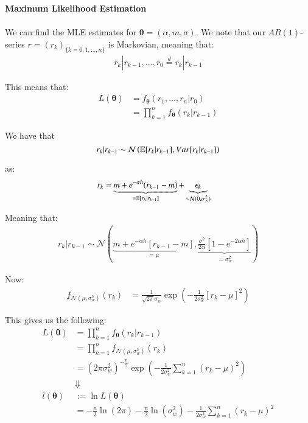 \newpage 
\textbf{Maximum Likelihood Estimation}
\\~\\ 
We can find the MLE   estimates for $\bm{\theta} = (\alpha, m, \sigma)$. We note that our $AR(1)$-series $r = (r_{k})_{\{k = 0, 1, \dots, n\}}$ is Markovian, meaning that: 
\begin{align*}
r_{k}|r_{k-1}, \dots, r_{0} \stackrel{d}{=} r_{k}|r_{k-1}    
\end{align*}

This means that: 
\begin{align*}
L(\bm{\theta}) &= f_{\bm{\theta}}(r_{1}, \dots, r_{n}|r_{0}) \\ 
&= \prod_{k=1}^{n}f_{\bm{\theta}}(r_{k}|r_{k-1})
\end{align*}

We have that 
\[
r_{k}|r_{k-1} \sim \mathcal{N}\left(
\mathbb{E}[r_{k}|r_{k-1}], Var[r_{k}|r_{k-1}]
\right)
\]

as: 
\begin{align*}
r_{k} &= \underbrace{m + e^{-\alpha h}(r_{k-1}-m)}_{= \mathbb{E}[r_{k}|r_{k-1}]} 
+ \underbrace{\epsilon_{k}}_{\sim \mathcal{N}(0, \sigma_{w}^{2})}    
\end{align*}

Meaning that: 
\begin{align*}
r_{k}|r_{k-1} \sim \mathcal{N}\left(
\underbrace{
m + e^{-\alpha h}[r_{k-1}-m]
}_{= \mu}, 
\underbrace{
\frac{\sigma^{2}}{2\alpha}\left[1-e^{-2\alpha h}\right]
}_{= \sigma_{w}^{2}}
\right)    
\end{align*}

Now: 
\begin{align*}
f_{\mathcal{N}(\mu, \sigma_{w}^{2})}(r_{k}) &=
\frac{1}{\sqrt{2\pi}\sigma_{w}}\exp\left(
-\frac{1}{2\sigma_{w}^{2}}\left[r_{k} - \mu \right]^{2}
\right)
\end{align*}

This gives us the following: 
\begin{align*}
L(\bm{\theta}) &= \prod_{k=1}^{n}f_{\bm{\theta}}(r_{k}|r_{k-1}) \\ 
&= 
\prod_{k=1}^{n}f_{\mathcal{N}(\mu, \sigma_{w}^{2})}(r_{k}) 
\\ 
&= 
(2\pi\sigma_{w}^{2})^{-\frac{n}{2}}\exp\left(
-\frac{1}{2\sigma_{w}^{2}}\sum_{k=1}^{n}\left(
r_{k} - \mu
\right)^{2}
\right) \\ 
&\Downarrow \\ 
l(\bm{\theta}) &:= \ln L(\bm{\theta}) \\
&= 
-\frac{n}{2}\ln(2\pi) - \frac{n}{2}\ln(\sigma_{w}^{2})
-\frac{1}{2\sigma_{w}^{2}}\sum_{k=1}^{n}\left(r_{k} - \mu \right)^{2}
\end{align*}

